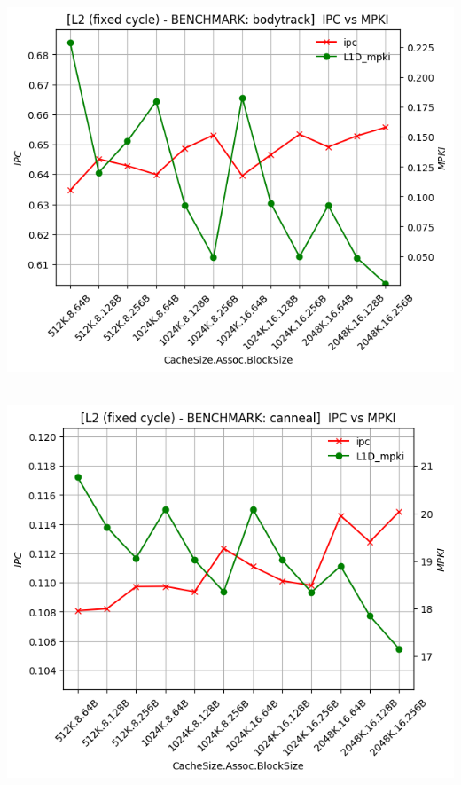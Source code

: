 \begin{minipage}{\textwidth}
    \begin{center}
        \\
        \vspace{3mm}
        \includegraphics[scale=0.70]{graphs/L2/fixed/bodytrack.png}
        \vspace{6mm}
    \end{center}
\end{minipage}

\begin{minipage}{\textwidth}
    \begin{center}
        \\
        \vspace{3mm}
        \includegraphics[scale=0.70]{graphs/L2/fixed/canneal.png}
        \vspace{6mm}
    \end{center}
\end{minipage}


